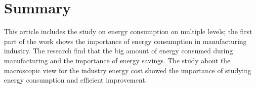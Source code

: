 \newpage
\section{Summary}


This article includes the study on energy consumption on multiple levels; the first part of the work shows the importance of energy consumption in manufacturing industry. The research find that the big amount of energy consumed during manufacturing and the importance of energy savings. The study about the macroscopic view for the industry energy cost showed the importance of studying energy consumption and efficient improvement. 



